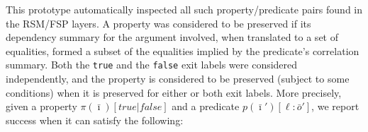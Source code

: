 \documentclass[11pt]{article}
\begin{document}
This  prototype automatically  inspected  all  such property/predicate  pairs
found in the RSM/FSP layers. A property was considered to be preserved if its
dependency summary  for the argument  involved, when translated  to a set of
equalities,  formed a  subset of  the equalities  implied by  the predicate's
correlation  summary.  Both  the  \texttt{true} and  the \texttt{false}  exit
labels were  considered independently, and  the property is considered  to be
preserved (subject  to some conditions)  when it  is preserved for  either or
both exit labels. %
%
More precisely, given  a property
$\pi(\bar{\imath})[\mathit{true} | \mathit{false}]$  and a predicate
$p(\bar{\imath}')[\ell: \bar{o}']$, we report success when it can satisfy the
following:
\end{document}
